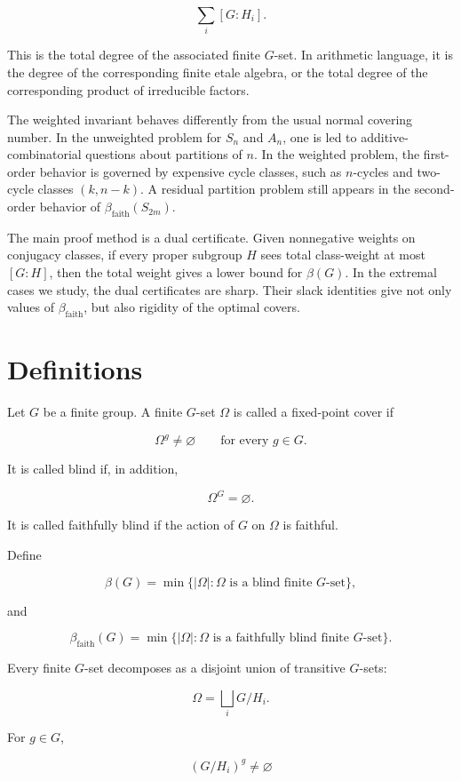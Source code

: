 \documentclass[11pt]{article}
\begin{document}
\[
\sum_i [G:H_i].
\]

This is the total degree of the associated finite $G$-set. In arithmetic language, it is the degree of the corresponding finite etale algebra, or the total degree of the corresponding product of irreducible factors.

The weighted invariant behaves differently from the usual normal covering number. In the unweighted problem for $S_n$ and $A_n$, one is led to additive-combinatorial questions about partitions of $n$. In the weighted problem, the first-order behavior is governed by expensive cycle classes, such as $n$-cycles and two-cycle classes $(k,n-k)$. A residual partition problem still appears in the second-order behavior of $\beta_{\mathrm{faith}}(S_{2m})$.

The main proof method is a dual certificate. Given nonnegative weights on conjugacy classes, if every proper subgroup $H$ sees total class-weight at most $[G:H]$, then the total weight gives a lower bound for $\beta(G)$. In the extremal cases we study, the dual certificates are sharp. Their slack identities give not only values of $\beta_{\mathrm{faith}}$, but also rigidity of the optimal covers.

\section{Definitions}

Let $G$ be a finite group. A finite $G$-set $\Omega$ is called a fixed-point cover if

\[
\Omega^g\ne\varnothing
\qquad
\text{for every }g\in G.
\]

It is called blind if, in addition,

\[
\Omega^G=\varnothing.
\]

It is called faithfully blind if the action of $G$ on $\Omega$ is faithful.

Define

\[
\beta(G)=\min\{|\Omega|:\Omega\text{ is a blind finite }G\text{-set}\},
\]

and

\[
\beta_{\mathrm{faith}}(G)=\min\{|\Omega|:\Omega\text{ is a faithfully blind finite }G\text{-set}\}.
\]

Every finite $G$-set decomposes as a disjoint union of transitive $G$-sets:

\[
\Omega=\bigsqcup_i G/H_i.
\]

For $g\in G$,

\[
(G/H_i)^g\ne\varnothing
\]
\end{document}
